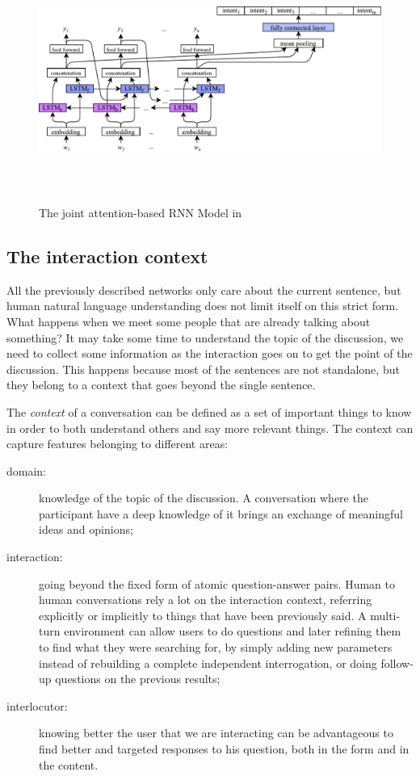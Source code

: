 \begin{figure}[!htb]
    \centering
    \includegraphics[max width=0.9\linewidth,max height=8cm,keepaspectratio]{figures/jointSLUrnn}
    \caption{The joint attention-based RNN Model in~\cite{liu2016attention}}\label{fig:jointSLUrnn}
\end{figure}

\subsection{The interaction context}
\label{soaInteractionContext}

All the previously described networks only care about the current sentence, but human natural language understanding does not limit itself on this strict form. What happens when we meet some people that are already talking about something? It may take some time to understand the topic of the discussion, we need to collect some information as the interaction goes on to get the point of the discussion. This happens because most of the sentences are not standalone, but they belong to a context that goes beyond the single sentence.

The \textit{context} of a conversation can be defined as a set of important things to know in order to both understand others and say more relevant things. The context can capture features belonging to different areas:

\begin{description}
	\item[domain:] knowledge of the topic of the discussion. A conversation where the participant have a deep knowledge of it brings an exchange of meaningful ideas and opinions;
	\item[interaction:] going beyond the fixed form of atomic question-answer pairs. Human to human conversations rely a lot on the interaction context, referring explicitly or implicitly to things that have been previously said. A multi-turn environment can allow users to do questions and later refining them to find what they were searching for, by simply adding new parameters instead of rebuilding a complete independent interrogation, or doing follow-up questions on the previous results;
	\item[interlocutor:] knowing better the user that we are interacting can be advantageous to find better and targeted responses to his question, both in the form and in the content.
\end{description}

